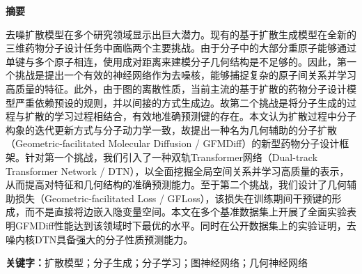 \cleardoublepage{}
\thispagestyle{previous}
\pagestyle{previous}
\setcounter{page}{1}

\clearpage
{}
\begin{center}
    \textbf{  \heiti 摘\quad 要}
\end{center}
\songti {}

去噪扩散模型在多个研究领域显示出巨大潜力。现有的基于扩散生成模型在全新的三维药物分子设计任务中面临两个主要挑战。由于分子中的大部分重原子能够通过单键与多个原子相连，使用成对距离来建模分子几何结构是不足够的。因此，第一个挑战是提出一个有效的神经网络作为去噪核，能够捕捉复杂的原子间关系并学习高质量的特征。此外，由于图的离散性质，当前主流的基于扩散的药物分子设计模型严重依赖预设的规则，并以间接的方式生成边。故第二个挑战是将分子生成的过程与扩散的学习过程相结合，有效地准确预测键的存在。本文认为扩散过程中分子构象的迭代更新方式与分子动力学一致，故提出一种名为几何辅助的分子扩散（Geometric-facilitated Molecular Diffusion / GFMDiff）的新型药物分子设计框架。针对第一个挑战，我们引入了一种双轨Transformer网络（Dual-track Transformer Network / DTN），以全面挖掘全局空间关系并学习高质量的表示，从而提高对特征和几何结构的准确预测能力。至于第二个挑战，我们设计了几何辅助损失（Geometric-facilitated Loss / GFLoss），该损失在训练期间干预键的形成，而不是直接将边嵌入隐变量空间。本文在多个基准数据集上开展了全面实验表明GFMDiff性能达到该领域时下最优的水平。同时在公开数据集上的实验证明，去噪内核DTN具备强大的分子性质预测能力。


\vspace{20pt}
\noindent \textbf{关键字：}扩散模型；分子生成；分子学习；图神经网络；几何神经网络

